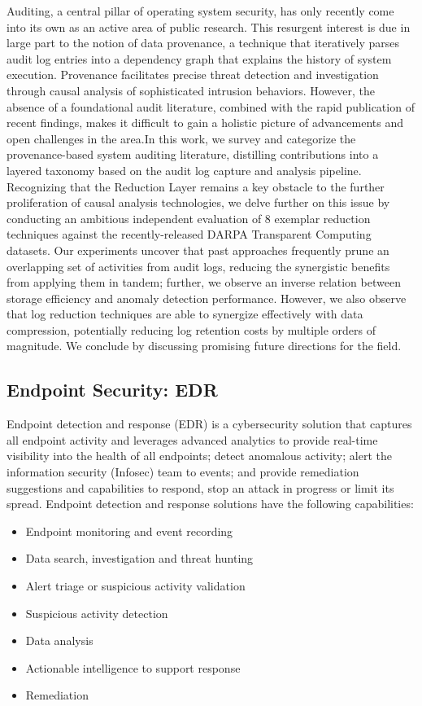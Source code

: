\documentclass{article}
\begin{document}
Auditing, a central pillar of operating system security, has only recently come into its own as an active area of public research. This resurgent interest is due in large part to the notion of data provenance, a technique that iteratively parses audit log entries into a dependency graph that explains the history of system execution. Provenance facilitates precise threat detection and investigation through causal analysis of sophisticated intrusion behaviors. However, the absence of a foundational audit literature, combined with the rapid publication of recent findings, makes it difficult to gain a holistic picture of advancements and open challenges in the area.In this work, we survey and categorize the provenance-based system auditing literature, distilling contributions into a layered taxonomy based on the audit log capture and analysis pipeline. Recognizing that the Reduction Layer remains a key obstacle to the further proliferation of causal analysis technologies, we delve further on this issue by conducting an ambitious independent evaluation of 8 exemplar reduction techniques against the recently-released DARPA Transparent Computing datasets. Our experiments uncover that past approaches frequently prune an overlapping set of activities from audit logs, reducing the synergistic benefits from applying them in tandem; further, we observe an inverse relation between storage efficiency and anomaly detection performance. However, we also observe that log reduction techniques are able to synergize effectively with data compression, potentially reducing log retention costs by multiple orders of magnitude. We conclude by discussing promising future directions for the field.


\subsection{Endpoint Security: EDR}

\textbf{} \textcite{Hayes:2023}

Endpoint detection and response (EDR) is a cybersecurity solution that captures all endpoint activity and leverages advanced analytics to provide real-time visibility into the health of all endpoints; detect anomalous activity; alert the information security (Infosec) team to events; and provide remediation suggestions and capabilities to respond, stop an attack in progress or limit its spread.
Endpoint detection and response solutions have the following capabilities:

\begin{itemize}
\item	Endpoint monitoring and event recording
\item	Data search, investigation and threat hunting
\item	Alert triage or suspicious activity validation
\item	Suspicious activity detection
\item	Data analysis
\item	Actionable intelligence to support response
\item	Remediation
\end{itemize}
\end{document}
